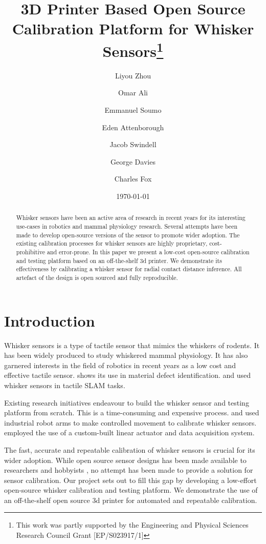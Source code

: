 \documentclass[runningheads]{llncs}
\title{3D Printer Based Open Source Calibration Platform for Whisker Sensors\thanks{This work was partly supported by the Engineering and Physical Sciences
Research Council Grant [EP/S023917/1]}}
\author{
    Liyou Zhou\orcidID{0009-0005-9491-9003} \and
    Omar Ali \and
    Emmanuel Soumo \and
    Eden Attenborough \and
    Jacob Swindell \and
    George Davies \and
    Charles Fox
}
\institute{School of Computer Science, University of Lincoln, Lincoln, UK}
\date{\today}
\begin{document}
\maketitle

\begin{abstract}
Whisker sensors have been an active area of research in recent years for its interesting use-cases in robotics and mammal physiology research. Several attempts have been made to develop open-source versions of the sensor to promote wider adoption. The existing calibration processes for whisker sensors are highly proprietary, cost-prohibitive and error-prone. In this paper we present a low-cost open-source calibration and testing platform based on an off-the-shelf 3d printer. We demonstrate its effectiveness by calibrating a whisker sensor for radial contact distance inference. All artefact of the design is open sourced and fully reproducible.
\end{abstract}

\section{Introduction}

Whisker sensors is a type of tactile sensor that mimics the whiskers of rodents. It has been widely produced to study whiskered mammal physiology\cite{prescottActiveTouchSensing2020}. It has also garnered interests in the field of robotics in recent years as a low cost and effective tactile sensor. \cite{fotouhiDetectionBarelyVisible2021} shows its use in material defect identification. \cite{struckmeierViTaSLAMBioinspiredVisuoTactile2019} and \cite{foxTactileSLAMBiomimetic2012} used whisker sensors in tactile SLAM tasks.

Existing research initiatives endeavour to build the whisker sensor and testing platform from scratch. This is a time-consuming and expensive process. \cite{sullivanTactileDiscriminationUsing2012a} and \cite{fotouhiDetectionBarelyVisible2021} used industrial robot arms to make controlled movement to calibrate whisker sensors. \cite{wegiriyaStiffnessControllableMultimodal2020} employed the use of a custom-built linear actuator and data acquisition system.

The fast, accurate and repeatable calibration of whisker sensors is crucial for its wider adoption. While open source sensor designs has been made available to researchers and hobbyists \cite{RatatouilleWhiskersOpenWhiskerOpen}, no attempt has been made to provide a solution for sensor calibration. Our project sets out to fill this gap by developing a low-effort open-source whisker calibration and testing platform. We demonstrate the use of an off-the-shelf open source 3d printer for automated and repeatable calibration.
\end{document}
